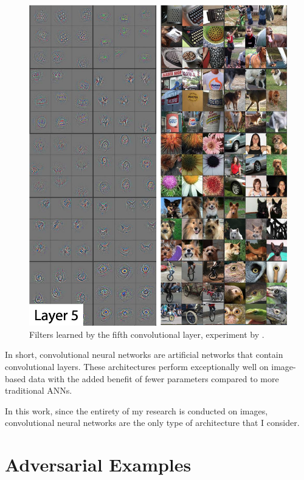 \begin{figure}[htp]
    \includegraphics[clip,width=1\columnwidth]{Figures/related/kernels_5.png}
    \caption{ Filters learned by the fifth convolutional layer, experiment by
        \cite{zeiler_visualizing_2013}. }
    \label{fig:kernels_5}
\end{figure}

In short, convolutional neural networks are artificial networks that contain
convolutional layers. These architectures perform exceptionally well on
image-based data with the added benefit of fewer parameters compared to more
traditional ANNs.


In this work, since the entirety of my research is conducted on images,
convolutional neural networks are the only type of architecture that I consider.

\section{Adversarial Examples}
\label{Adversarial_examples}

